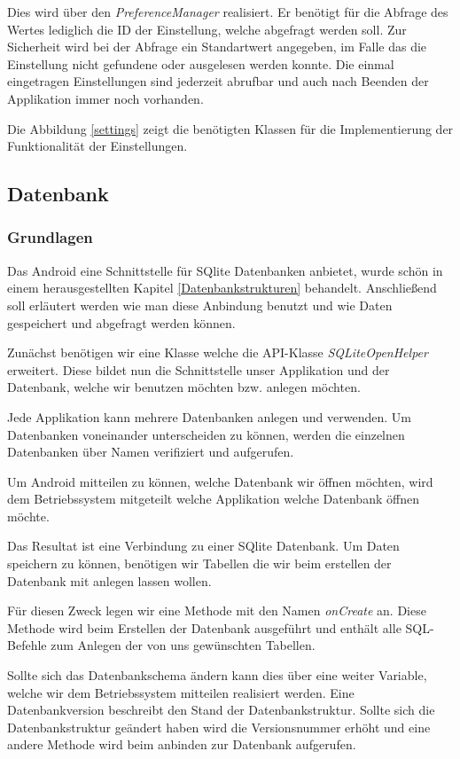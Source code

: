 Dies wird über den \textit{PreferenceManager} realisiert. Er benötigt für die Abfrage des Wertes lediglich die ID der Einstellung, welche abgefragt werden soll. Zur Sicherheit wird bei der Abfrage ein Standartwert angegeben, im Falle das die Einstellung nicht gefundene oder ausgelesen werden konnte. Die einmal eingetragen Einstellungen sind jederzeit abrufbar und auch nach Beenden der Applikation immer noch vorhanden.

Die Abbildung \ref{settings} zeigt die benötigten Klassen für die Implementierung der Funktionalität der Einstellungen.


\subsection{Datenbank}
\subsubsection{Grundlagen}
Das Android eine Schnittstelle für SQlite Datenbanken anbietet, wurde schön in einem herausgestellten Kapitel \ref{Datenbankstrukturen} behandelt. Anschließend soll erläutert werden wie man diese Anbindung benutzt und wie Daten gespeichert und abgefragt werden können.

Zunächst benötigen wir eine Klasse welche die API-Klasse \textit{SQLiteOpenHelper} erweitert. Diese bildet nun die Schnittstelle unser Applikation und der Datenbank, welche wir benutzen möchten bzw. anlegen möchten.

Jede Applikation kann mehrere Datenbanken anlegen und verwenden. Um Datenbanken voneinander unterscheiden zu können, werden die einzelnen Datenbanken über Namen verifiziert und aufgerufen.

Um Android mitteilen zu können, welche Datenbank wir öffnen möchten, wird dem Betriebssystem mitgeteilt welche Applikation welche Datenbank öffnen möchte.

Das Resultat ist eine Verbindung zu einer SQlite Datenbank. Um Daten speichern zu können, benötigen wir Tabellen die wir beim erstellen der Datenbank mit anlegen lassen wollen.

Für diesen Zweck legen wir eine Methode mit den Namen \textit{onCreate} an. Diese Methode wird beim Erstellen der Datenbank ausgeführt und enthält alle SQL-Befehle zum Anlegen der von uns gewünschten Tabellen.

Sollte sich das Datenbankschema ändern kann dies über eine weiter Variable, welche wir dem Betriebssystem mitteilen realisiert werden. Eine Datenbankversion beschreibt den Stand der Datenbankstruktur. Sollte sich die Datenbankstruktur geändert haben wird die Versionsnummer erhöht und eine andere Methode wird beim anbinden zur Datenbank aufgerufen.


